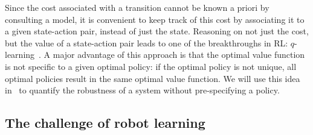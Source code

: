 Since the cost associated with a transition cannot be known a priori by consulting a model, it is convenient to keep track of this cost by associating it to a given state-action pair, instead of just the state. Reasoning on not just the cost, but the value of a state-action pair leads to one of the breakthroughs in RL: $q$-learning~\cite[cf. chapter 6.5]{sutton2018book}. A major advantage of this approach is that the optimal value function is not specific to a given optimal policy: if the optimal policy is not unique, all optimal policies result in the same optimal value function. We will use this idea in~\cite{heim2019beyond} to quantify the robustness of a system without pre-specifying a policy.

\subsection{The challenge of robot learning}

